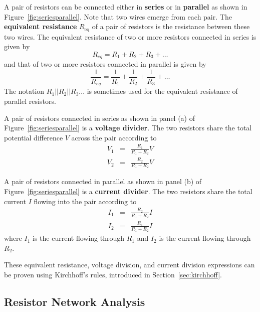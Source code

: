 \documentclass[11pt]{article}
\begin{document}
A pair of resistors can be connected either in \textbf{series} or in
\textbf{parallel} as shown in Figure~\ref{fig:seriesparallel}.  Note
that two wires emerge from each pair. The \textbf{equivalent
  resistance} $R_\mathrm{eq}$ of a pair of resistors is the resistance
between these two wires. The equivalent resistance of two or more
resistors connected in series is given by
\begin{equation}
  R_{eq} = R_1 + R_2 + R_3 + \ldots
  \label{eq:Rseries}
\end{equation}
and that of two or more resistors connected in parallel is given by
\begin{equation}
  \frac{1}{R_{eq}} = \frac{1}{R_1} + \frac{1}{R_2} + \frac{1}{R_3} +
  \ldots
  \label{eq:Rparallel}
\end{equation}
The notation $R_1||R_2||R_3...$ is sometimes used for the equivalent
resistance of parallel resistors.

A pair of resistors connected in series as shown in panel (a) of
Figure~\ref{fig:seriesparallel} is a \textbf{voltage divider}. The two
resistors share the total potential difference $V$ across the
pair according to
\begin{eqnarray}
  \nonumber
  V_1 & = & \frac{R_1}{R_1 + R_2} V \\ 
  V_2 & = & \frac{R_2}{R_1 + R_2} V
  \label{eq:Vdiv}
\end{eqnarray}

A pair of resistors connected in parallel as shown in panel (b) of
Figure~\ref{fig:seriesparallel} is a \textbf{current divider}. The two
resistors share the total current $I$ flowing into the pair according
to
\begin{eqnarray}
  \nonumber I_1 & = & \frac{R_2}{R_1 + R_2} I \\ I_2 & = &
  \frac{R_1}{R_1 + R_2} I
  \label{eq:Idiv}
\end{eqnarray}
where $I_1$ is the current flowing through $R_1$ and $I_2$ is the
current flowing through $R_2$.

These equivalent resistance, voltage division, and current division
expressions can be proven using Kirchhoff's rules, introduced in
Section~\ref{sec:kirchhoff}.

\subsection{Resistor Network Analysis}
\label{sec:rnetwork}
\end{document}
